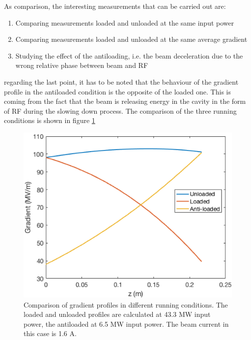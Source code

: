 As comparison, the interesting measurements that can be carried out are:
\begin{enumerate}
\item Comparing measurements loaded and unloaded at the same input power
\item Comparing measurements loaded and unloaded at the same average gradient
\item Studying the effect of the antiloading, i.e. the beam deceleration due to the wrong relative phase between beam and RF
\end{enumerate}
regarding the last point, it has to be noted that the behaviour of the gradient profile in the antiloaded condition is the opposite of the loaded one. This is coming from the fact that the beam is releasing energy in the cavity in the form of RF during the slowing down process. The comparison of the three running conditions is shown in figure \ref{3grad}

\begin{figure}[h]
\centering 
\includegraphics[scale=1]{pictures/3gradient.png}
\caption{Comparison of gradient profiles in different running conditions. The loaded and unloaded profiles are calculated at 43.3 MW input power, the antiloaded at 6.5 MW input power. The beam current in this case is 1.6 A.}
\label{3grad}
\end{figure}